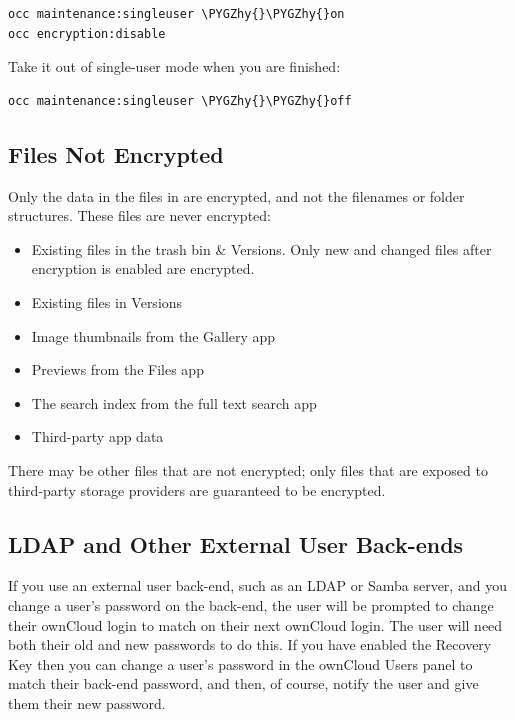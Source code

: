 \documentclass[letterpaper,10pt,english]{sphinxmanual}
\def\PYGZhy{\char`\-}
\begin{document}
\begin{Verbatim}[commandchars=\\\{\}]
occ maintenance:singleuser \PYGZhy{}\PYGZhy{}on
occ encryption:disable
\end{Verbatim}

Take it out of single-user mode when you are finished:

\begin{Verbatim}[commandchars=\\\{\}]
occ maintenance:singleuser \PYGZhy{}\PYGZhy{}off
\end{Verbatim}


\subsection{Files Not Encrypted}
\label{configuration_files/encryption_configuration:files-not-encrypted}
Only the data in the files in  are encrypted, and not the
filenames or folder structures. These files are never encrypted:
\begin{itemize}
\item {} 
Existing files in the trash bin \& Versions. Only new and changed files after
encryption is enabled are encrypted.

\item {} 
Existing files in Versions

\item {} 
Image thumbnails from the Gallery app

\item {} 
Previews from the Files app

\item {} 
The search index from the full text search app

\item {} 
Third-party app data

\end{itemize}

There may be other files that are not encrypted; only files that are exposed to
third-party storage providers are guaranteed to be encrypted.


\subsection{LDAP and Other External User Back-ends}
\label{configuration_files/encryption_configuration:ldap-and-other-external-user-back-ends}
If you use an external user back-end, such as an LDAP or Samba server, and you
change a user's password on the back-end, the user will be prompted to change
their ownCloud login to match on their next ownCloud login. The user will need
both their old and new passwords to do this. If you have enabled the Recovery
Key then you can change a user's password in the ownCloud Users panel to match
their back-end password, and then, of course, notify the user and give them
their new password.
\end{document}

